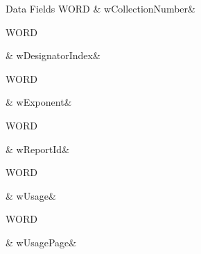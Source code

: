 \begin{DoxyFields}{Data Fields}
\hypertarget{a00003_ad962b6446afb5cdce525b95c0396fe5a}{W\-O\-R\-D}\label{a00003_ad962b6446afb5cdce525b95c0396fe5a}
&
w\-Collection\-Number&
\\
\hline

\hypertarget{a00003_aca3a581b38716dce31cad00c6e75c283}{W\-O\-R\-D}\label{a00003_aca3a581b38716dce31cad00c6e75c283}
&
w\-Designator\-Index&
\\
\hline

\hypertarget{a00003_a23ec7baf057162933a77bd8e3c3c976d}{W\-O\-R\-D}\label{a00003_a23ec7baf057162933a77bd8e3c3c976d}
&
w\-Exponent&
\\
\hline

\hypertarget{a00003_a6664c6e9cad28120cd3f7d7679680b4b}{W\-O\-R\-D}\label{a00003_a6664c6e9cad28120cd3f7d7679680b4b}
&
w\-Report\-Id&
\\
\hline

\hypertarget{a00003_a0d3e1ceaeb1960389350277978573941}{W\-O\-R\-D}\label{a00003_a0d3e1ceaeb1960389350277978573941}
&
w\-Usage&
\\
\hline

\hypertarget{a00003_ab55ab386802010c34f363f9a2615be89}{W\-O\-R\-D}\label{a00003_ab55ab386802010c34f363f9a2615be89}
&
w\-Usage\-Page&
\\
\hline

\end{DoxyFields}
\label{d8/d53/a00081}
\hypertarget{a00003_d8/d53/a00081}{}
